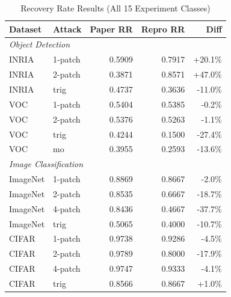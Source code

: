 
\begin{table}[htbp]
\centering
\caption{Recovery Rate Results (All 15 Experiment Classes)}
\label{tab:recovery_rate_full}
\begin{tabular}{llrrr}
\toprule
Dataset & Attack & Paper RR & Repro RR & Diff \\
\midrule
\multicolumn{5}{l}{\textit{Object Detection}} \\
\midrule
INRIA & 1-patch & 0.5909 & 0.7917 & +20.1\% \\
INRIA & 2-patch & 0.3871 & 0.8571 & +47.0\% \\
INRIA & trig & 0.4737 & 0.3636 & -11.0\% \\
\midrule
VOC & 1-patch & 0.5404 & 0.5385 & -0.2\% \\
VOC & 2-patch & 0.5376 & 0.5263 & -1.1\% \\
VOC & trig & 0.4244 & 0.1500 & -27.4\% \\
VOC & mo & 0.3955 & 0.2593 & -13.6\% \\
\midrule
\multicolumn{5}{l}{\textit{Image Classification}} \\
\midrule
ImageNet & 1-patch & 0.8869 & 0.8667 & -2.0\% \\
ImageNet & 2-patch & 0.8535 & 0.6667 & -18.7\% \\
ImageNet & 4-patch & 0.8436 & 0.4667 & -37.7\% \\
ImageNet & trig & 0.5065 & 0.4000 & -10.7\% \\
\midrule
CIFAR & 1-patch & 0.9738 & 0.9286 & -4.5\% \\
CIFAR & 2-patch & 0.9789 & 0.8000 & -17.9\% \\
CIFAR & 4-patch & 0.9747 & 0.9333 & -4.1\% \\
CIFAR & trig & 0.8566 & 0.8667 & +1.0\% \\
\bottomrule
\end{tabular}
\end{table}


